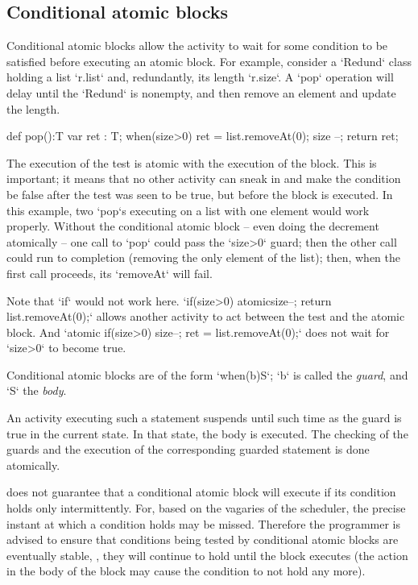 \subsection{Conditional atomic blocks}



Conditional atomic blocks allow the activity to wait for some condition to be
satisfied before executing an atomic block. For example, consider a
\xcd`Redund` class holding a list \xcd`r.list` and, redundantly, its length
\xcd`r.size`.  A \xcd`pop` operation will delay until the \xcd`Redund` is
nonempty, and then remove an element and update the length.  
\begin{xten}
def pop():T {
  var ret : T;
  when(size>0) {
    ret = list.removeAt(0);
    size --;
    }
  return ret;
}
\end{xten}


The execution of the test is atomic with the execution of the block.  This is
important; it means that no other activity can sneak in and make the condition
be false after the test was seen to be true, but 
before the block is executed.  In this example, two \xcd`pop`s
executing on a list with one element would work properly. Without the
conditional atomic block -- even doing the decrement atomically -- one call to
\xcd`pop` could pass the \xcd`size>0` guard; then the other call could run to
completion (removing the only element of the list); then, when the first call
proceeds, its \xcd`removeAt` will fail.  

Note that \xcd`if` would not work here.  
\xcd`if(size>0) atomic{size--; return list.removeAt(0);}` allows another
activity to act between the test and the atomic block.  
And 
\xcd`atomic{ if(size>0) {size--; ret = list.removeAt(0);}}` 
does not wait for \xcd`size>0` to become true.


Conditional atomic blocks are of the form \xcd`when(b)S`; 
\xcd`b` is called the {\em guard}, and \xcd`S` the {\em body}.

An activity executing such a statement suspends until such time as the  guard
is true in the current state. In that state, the 
body is executed. 
The checking of the guards and the execution of the corresponding
guarded statement is done atomically. 

\Xten{} does not guarantee that a conditional atomic block
will execute if its condition holds only intermittently. For, based on
the vagaries of the scheduler, the precise instant at which a
condition holds may be missed. Therefore the programmer is advised to
ensure that conditions being tested by conditional atomic blocks are
eventually stable, \ie, they will continue to hold until the block
executes (the action in the body of the block may cause the condition
to not hold any more).





